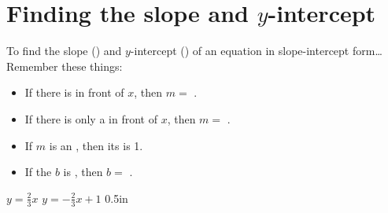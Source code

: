 \section{Finding the slope and $y$-intercept}

\begin{myConcept}{%
        To find the slope () 
        and $y$-intercept () 
        of an equation in slope-intercept form\dots
    }
    Remember these things:
    \begin{itemize}
        \item If there is  in front of $x$, then $m = $ .
        \item If there is only a  in front of $x$, then $m = $ .
        \item If $m$ is an , then its  is 1.
        \item If the $b$ is , then $b = $ .
    \end{itemize}
\end{myConcept}



\myProblems%
{
    $y = \frac{2}{3}x$   
}
{
    $y = -\frac{2}{3}x + 1$   
}{0.5in}

